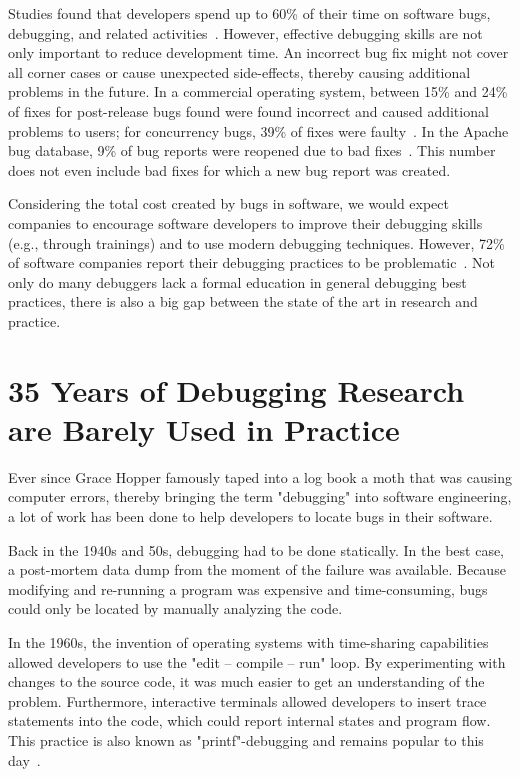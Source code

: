 Studies found that developers spend up to 60\% of their time on software bugs, debugging, and related activities~\cite{ballou08:improving_software_quality, hailpern02:software_debugging_testing, beizer03:software_testing_techniques}.
However, effective debugging skills are not only important to reduce development time.
An incorrect bug fix might not cover all corner cases or cause unexpected side-effects, thereby causing additional problems in the future.
In a commercial operating system, between 15\% and 24\% of fixes for post-release bugs found were found incorrect and caused additional problems to users; for concurrency bugs, 39\% of fixes were faulty~\cite{yin11:how_do_fixes_become}.
In the Apache bug database, 9\% of bug reports were reopened due to bad fixes~\cite{gu10:has_the_bug_really}.
This number does not even include bad fixes for which a new bug report was created.

Considering the total cost created by bugs in software, we would expect companies to encourage software developers to improve their debugging skills (e.g., through trainings) and to use modern debugging techniques.
However, 72\% of software companies report their debugging practices to be problematic~\cite{ballou08:improving_software_quality}.
Not only do many debuggers lack a formal education in general debugging best practices, there is also a big gap between the state of the art in research and practice.



\section{35 Years of Debugging Research are Barely Used in Practice}

Ever since Grace Hopper famously taped into a log book a moth that was causing computer errors, thereby bringing the term "debugging" into software engineering, a lot of work has been done to help developers to locate bugs in their software.

Back in the 1940s and 50s, debugging had to be done statically.
In the best case, a post-mortem data dump from the moment of the failure was available.
Because modifying and re-running a program was expensive and time-consuming, bugs could only be located by manually analyzing the code.

In the 1960s, the invention of operating systems with time-sharing capabilities allowed developers to use the "edit -- compile -- run" loop.
By experimenting with changes to the source code, it was much easier to get an understanding of the problem.
Furthermore, interactive terminals allowed developers to insert trace statements into the code, which could report internal states and program flow.
This practice is also known as "printf"-debugging and remains popular to this day~\cite{perscheid17:studying_the_advancement}.

